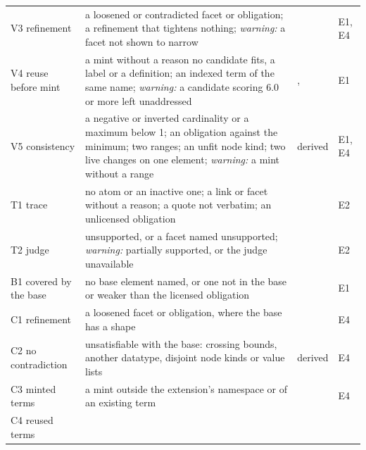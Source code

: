 \begin{table}[tp]
\begin{tabular}{@{}>{\raggedright\arraybackslash}p{2.08cm}>{\raggedright\arraybackslash}p{8.29cm}%
      >{\raggedright\arraybackslash}p{0.9cm}>{\raggedright\arraybackslash}p{0.5cm}@{}}
    V3 refinement %
      & a loosened or contradicted facet or obligation; a refinement that tightens nothing; \emph{warning:} a
        facet not shown to narrow
      & \cite{semicreuse2026} & E1, E4\\
    V4 reuse before mint %
      & a mint without a reason no candidate fits, a label or a definition; an indexed term of the same name;
        \emph{warning:} a candidate scoring 6.0 or more left unaddressed
      & \cite{semicreuse2026}, \cite{fathallah2026rigor,lippolis2025ontology} & E1\\
    V5 consistency %
      & a negative or inverted cardinality or a maximum below 1; an obligation against the minimum; two ranges;
        an unfit node kind; two live changes on one element; \emph{warning:} a mint without a range
      & derived & E1, E4\\
    T1 trace %
      & no atom or an inactive one; a link or facet without a reason; a quote not verbatim; an unlicensed
        obligation
      & \cite{fathallah2026rigor} & E2\\
    T2 judge %
      & unsupported, or a facet named unsupported; \emph{warning:} partially supported, or the judge unavailable
      & \cite{rashkin2023ais} & E2\\
    B1 covered by the base %
      & no base element named, or one not in the base or weaker than the licensed obligation
      & \cite{lippolis2025ontology} & E1\\
    \midrule
    C1 refinement %
      & a loosened facet or obligation, where the base has a shape
      & \cite{semicreuse2026} & E4\\
    C2 no contradiction %
      & unsatisfiable with the base: crossing bounds, another datatype, disjoint node kinds or value lists
      & derived & E4\\
    C3 minted terms %
      & a mint outside the extension's namespace or of an existing term
      & \cite{semicreuse2026} & E4\\
    C4 reused terms %

\end{tabular}
\end{table}
